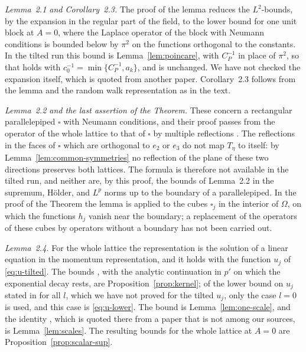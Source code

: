 \documentclass[11pt]{preprint}
\numberwithin{equation}{section}
\theoremstyle{definition}
\theoremstyle{remark}
\theoremstyle{plain}
\begin{document}
\emph{Lemma~2.1 and Corollary~2.3.} The proof of the lemma reduces the $L^2$-bounds, by the expansion \cite[(2.24)--(2.26)]{BalabanRDG} in the regular part of the field, to the lower bound \cite[(2.27)]{BalabanRDG} for one unit block at $A = 0$, where the Laplace operator of the block with Neumann conditions is bounded below by $\pi^2$ on the functions orthogonal to the constants. In the tilted run this bound is Lemma~\ref{lem:poincare}, with $C_P^{-1}$ in place of $\pi^2$, so that \cite[(2.28)]{BalabanRDG} holds with $c_0^{-1} = \min\{ C_P^{-1}, a_k \}$, and \cite[(2.29)]{BalabanRDG} is unchanged. We have not checked the expansion \cite[(2.24)]{BalabanRDG} itself, which is quoted from another paper. Corollary~2.3 follows from the lemma and the random walk representation as in the text.

\emph{Lemma~2.2 and the last assertion of the Theorem.} These concern a rectangular parallelepiped $\square$ with Neumann conditions, and their proof passes from the operator of the whole lattice to that of $\square$ by multiple reflections \cite[(2.42)]{BalabanRDG}. The reflections in the faces of $\square$ which are orthogonal to $e_2$ or $e_3$ do not map $T_\eta$ to itself: by Lemma~\ref{lem:common-symmetries} no reflection of the plane of these two directions preserves both lattices. The formula \cite[(2.42)]{BalabanRDG} is therefore not available in the tilted run, and neither are, by this proof, the bounds of Lemma~2.2 in the supremum, H\"older, and $L^p$ norms up to the boundary of a parallelepiped. In the proof of the Theorem the lemma is applied to the cubes $\square_j$ in the interior of $\varOmega$, on which the functions $h_j$ vanish near the boundary; a replacement of the operators of these cubes by operators without a boundary has not been carried out.

\emph{Lemma~2.4.} For the whole lattice the representation \cite[(2.43)--(2.48)]{BalabanRDG} is the solution of a linear equation in the momentum representation, and it holds with the function $u_j$ of \eqref{eq:u-tilted}. The bounds \cite[(2.35), (2.36)]{BalabanRDG}, with the analytic continuation in $p'$ on which the exponential decay rests, are Proposition~\ref{prop:kernel}; of the lower bound on $u_j$ stated in \cite[p.~585]{BalabanRDG} for all $l$, which we have not proved for the tilted $u_j$, only the case $l = 0$ is used, and this case is \eqref{eq:u-lower}. The bound \cite[(2.37)]{BalabanRDG} is Lemma~\ref{lem:one-scale}, and the identity \cite[(2.34)]{BalabanRDG}, which is quoted there from a paper that is not among our sources, is Lemma~\ref{lem:scales}. The resulting bounds for the whole lattice at $A = 0$ are Proposition~\ref{prop:scalar-sup}.
\end{document}
